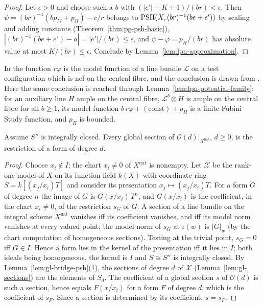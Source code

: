 \begin{proof}
Let $\epsilon>0$ and choose such a $b$ with $(|e'|+K+1)/(br)<\epsilon$. Then
$\psi=(br)^{-1}(bp_M+p_H)-c/r$ belongs to $\operatorname{PSH}(X,(br)^{-1}(be+e'))$ by scaling and adding constants
(Theorem~\ref{thm:pg-psh-basic}), $|(br)^{-1}(be+e')-a|=|e'|/(br)\le\epsilon$, and
$\psi-\varphi=p_H/(br)$ has absolute value at most $K/(br)\le\epsilon$. Conclude by
Lemma~\ref{lem:lpn-approximation}.
\end{proof}

\begin{remark}
In \cite[Lemma~5.5]{FHX} the function $r\varphi$ is the model function of a line bundle $\mathcal L$ on a
test configuration which is nef on the central fibre, and the conclusion is drawn from \cite[Lemma~4.3]{BJ22}.
Here the same conclusion is reached through Lemma~\ref{lem:lpn-potential-family}: for an auxiliary line $H$
ample on the central fibre, $\mathcal L^{b}\otimes H$ is ample on the central fibre for all $b\ge1$, its model
function $b\,r\varphi+(\text{const})+p_H$ is a finite Fubini--Study function, and $p_H$ is bounded.
\end{remark}

\begin{lemma}\label{lem:lpn-sections-forms}
\leanok
{}
Assume $S''$ is integrally closed. Every global section of $\mathcal O(d)|_{X^{\mathrm{nat}}}$, $d\ge0$, is the
restriction of a form of degree $d$.
\end{lemma}

\begin{proof}
Choose $x_i\notin I$; the chart $x_i\ne0$ of $X^{\mathrm{nat}}$ is nonempty. Let $\mathcal X$ be the rank-one
model of $X$ on its function field $k(X)$ with coordinate ring $S=k[(x_j/x_i)T]$ and consider its
presentation $x_j\mapsto(x_j/x_i)T$. For a form $G$ of degree $n$ the image of $G$ is $G(x/x_i)\,T^n$, and
$G(x/x_i)$ is the coefficient, in the chart $x_i\neq0$, of the restriction $s_G$ of $G$. A section of a line
bundle on the integral scheme $X^{\mathrm{nat}}$ vanishes iff its coefficient vanishes, and iff its model norm
vanishes at every valued point; the model norm of $s_G$ at $\iota(w)$ is $|G|_w$ (by
the chart computation of homogeneous sections). Testing at the trivial point, $s_G=0$ iff $G\in I$. Hence a form lies in the
kernel of the presentation iff it lies in $I$; both ideals being homogeneous, the kernel is $I$ and
$S\cong S''$ is integrally closed. By Lemma~\ref{lem:gl-bridge-psh}(1), the sections of degree $d$ of
$\mathcal X$ (Lemma~\ref{lem:gl-sections}) are the elements of $S_d$. The coefficient of a global section $s$ of
$\mathcal O(d)$ is such a section, hence equals $F(x/x_i)$ for a form $F$ of degree $d$, which is the
coefficient of $s_F$. Since a section is determined by its coefficient, $s=s_F$.
\end{proof}

